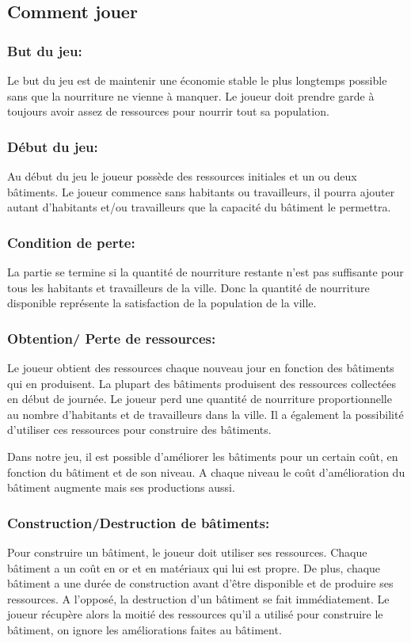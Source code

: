\documentclass[a4paper,11pt]{article}
\begin{document}
\subsection{Comment jouer} %

\subsubsection{But du jeu:}
Le but du jeu est de maintenir une économie stable le plus longtemps possible sans que la nourriture ne vienne à manquer. Le joueur doit prendre garde à toujours avoir assez de ressources pour nourrir tout sa population.

\subsubsection{Début du jeu:}
Au début du jeu le joueur possède des ressources initiales et un ou deux bâtiments. Le joueur commence sans habitants ou travailleurs, il pourra ajouter autant d'habitants et/ou travailleurs que la capacité du bâtiment le permettra.

\subsubsection{Condition de perte:}
La partie se termine si la quantité de nourriture restante n'est pas suffisante pour tous les habitants et travailleurs de la ville. Donc la quantité de nourriture disponible représente la satisfaction de la population de la ville.

\subsubsection{Obtention/ Perte de ressources:}
Le joueur obtient des ressources chaque nouveau jour en fonction des bâtiments qui en produisent. La plupart des bâtiments produisent des ressources collectées en début de journée. Le joueur perd une quantité de nourriture proportionnelle au nombre d'habitants et de travailleurs dans la ville. Il a également la possibilité d'utiliser ces ressources pour construire des bâtiments.

Dans notre jeu, il est possible d'améliorer les bâtiments pour un certain coût, en fonction du bâtiment et de son niveau. A chaque niveau le coût d'amélioration du bâtiment augmente mais ses productions aussi.

\subsubsection{Construction/Destruction de bâtiments:}
Pour construire un bâtiment, le joueur doit utiliser ses ressources. Chaque bâtiment a un coût en or et en matériaux qui lui est propre. De plus, chaque bâtiment a une durée de construction avant d'être disponible et de produire ses ressources.
A l'opposé, la destruction d'un bâtiment se fait immédiatement. Le joueur récupère alors la moitié des ressources qu'il a utilisé pour construire le bâtiment, on ignore les améliorations faites au bâtiment.
\end{document}
